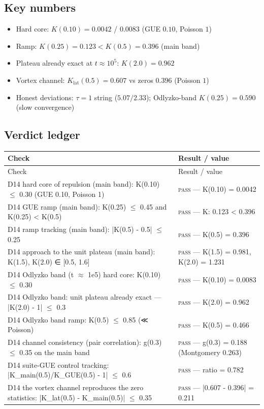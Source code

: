 \documentclass[11pt,a4paper]{article}
\begin{document}
\subsection{Key numbers}
\begin{tcolorbox}[colback=labblue!6, colframe=labblue!70!black, boxrule=0.6pt, title={Key results (canonical run)}]
\begin{itemize}[leftmargin=1.2em, itemsep=0.15em]
\item Hard core: $K(0.10) = 0.0042$ / $0.0083$ (GUE $0.10$, Poisson $1$)
\item Ramp: $K(0.25) = 0.123 < K(0.5) = 0.396$ (main band)
\item Plateau already exact at $t \approx 10^5$: $K(2.0) = 0.962$
\item Vortex channel: $K_{\mathrm{lat}}(0.5) = 0.607$ vs zeros $0.396$ (Poisson $1$)
\item Honest deviations: $\tau=1$ string ($5.07/2.33$); Odlyzko-band $K(0.25) = 0.590$ (slow convergence)
\end{itemize}
\end{tcolorbox}

\subsection{Verdict ledger}
\begin{longtable}{@{}p{}p{}@{}}
\toprule
Check & Result / value \\
\midrule
\endfirsthead
\toprule
Check & Result / value \\
\midrule
\endhead
\bottomrule
\endfoot
D14 hard core of repulsion (main band): K(0.10) $\le$ 0.30 (GUE 0.10, Poisson 1) & \textsc{pass} --- K(0.10) = 0.0042 \\
D14 GUE ramp (main band): K(0.25) $\le$ 0.45 and K(0.25) < K(0.5) & \textsc{pass} --- K: 0.123 < 0.396 \\
D14 ramp tracking (main band): |K(0.5) - 0.5| $\le$ 0.25 & \textsc{pass} --- K(0.5) = 0.396 \\
D14 approach to the unit plateau (main band): K(1.5), K(2.0) ∈ [0.5, 1.6] & \textsc{pass} --- K(1.5) = 0.981, K(2.0) = 1.231 \\
D14 Odlyzko band (t $\approx$ 1e5) hard core: K(0.10) $\le$ 0.30 & \textsc{pass} --- K(0.10) = 0.0083 \\
D14 Odlyzko band: unit plateau already exact — |K(2.0) - 1| $\le$ 0.3 & \textsc{pass} --- K(2.0) = 0.962 \\
D14 Odlyzko band ramp: K(0.5) $\le$ 0.85 (≪ Poisson) & \textsc{pass} --- K(0.5) = 0.466 \\
D14 channel consistency (pair correlation): g(0.3) $\le$ 0.35 on the main band & \textsc{pass} --- g(0.3) = 0.188 (Montgomery 0.263) \\
D14 suite-GUE control tracking: |K\_main(0.5)/K\_GUE(0.5) - 1| $\le$ 0.6 & \textsc{pass} --- ratio = 0.782 \\
D14 the vortex channel reproduces the zero statistics: |K\_lat(0.5) - K\_main(0.5)| $\le$ 0.35 & \textsc{pass} --- |0.607 - 0.396| = 0.211 \\
\end{longtable}
\end{document}
